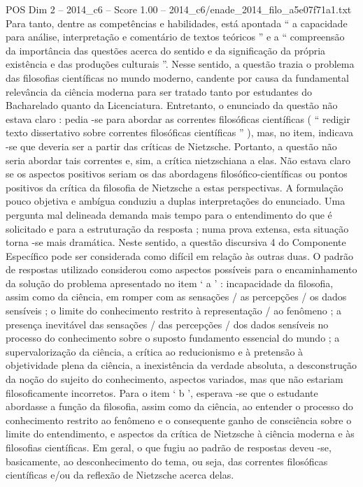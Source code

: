 \begin{textsample}{POS Dim 2 – 2014\_c6 – Score 1.00 – 2014\_c6/enade\_2014\_filo\_a5e07f71a1.txt}
Para tanto, dentre as competências e habilidades, está apontada “ a capacidade para análise, interpretação e comentário de textos teóricos ” e a “ compreensão da importância das questões acerca do sentido e da significação da própria existência e das produções culturais ”.
Nesse sentido, a questão trazia o problema das filosofias científicas no mundo moderno, candente por causa da fundamental relevância da ciência moderna para ser tratado tanto por estudantes do Bacharelado quanto da Licenciatura.
Entretanto, o enunciado da questão não estava claro : pedia -se para abordar as correntes filosóficas científicas ( “ redigir texto dissertativo sobre correntes filosóficas científicas ” ), mas, no item, indicava -se que deveria ser a partir das críticas de Nietzsche.
Portanto, a questão não seria abordar tais correntes e, sim, a crítica nietzschiana a elas.
Não estava claro se os aspectos positivos seriam os das abordagens filosófico-científicas ou pontos positivos da crítica da filosofia de Nietzsche a estas perspectivas.
A formulação pouco objetiva e ambígua conduziu a duplas interpretações do enunciado.
Uma pergunta mal delineada demanda mais tempo para o entendimento do que é solicitado e para a estruturação da resposta ; numa prova extensa, esta situação torna -se mais dramática.
Neste sentido, a questão discursiva 4 do Componente Específico pode ser considerada como difícil em relação às outras duas.
O padrão de respostas utilizado considerou como aspectos possíveis para o encaminhamento da solução do problema apresentado no item ‘ a ’ : incapacidade da filosofia, assim como da ciência, em romper com as sensações / as percepções / os dados sensíveis ; o limite do conhecimento restrito à representação / ao fenômeno ; a presença inevitável das sensações / das percepções / dos dados sensíveis no processo do conhecimento sobre o suposto fundamento essencial do mundo ; a supervalorização da ciência, a crítica ao reducionismo e à pretensão à objetividade plena da ciência, a inexistência da verdade absoluta, a desconstrução da noção do sujeito do conhecimento, aspectos variados, mas que não estariam filosoficamente incorretos.
Para o item ‘ b ’, esperava -se que o estudante abordasse a função da filosofia, assim como da ciência, ao entender o processo do conhecimento restrito ao fenômeno e o consequente ganho de consciência sobre o limite do entendimento, e aspectos da crítica de Nietzsche à ciência moderna e às filosofias científicas.
Em geral, o que fugiu ao padrão de respostas deveu -se, basicamente, ao desconhecimento do tema, ou seja, das correntes filosóficas científicas e/ou da reflexão de Nietzsche acerca delas.

\end{textsample}
